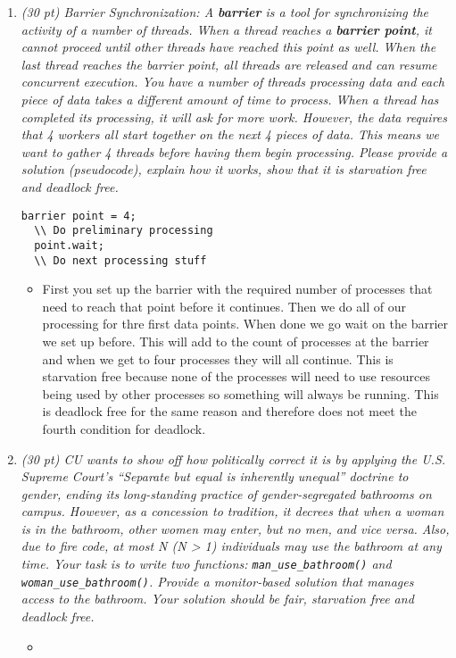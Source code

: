 \documentclass[12pt]{article}
\begin{document}
\begin{enumerate}
\pagebreak
\item{\textit{(30 pt) Barrier Synchronization: A \textbf{barrier} is a tool for synchronizing the activity of a number of threads. When a thread reaches a \textbf{barrier point}, it cannot proceed until other threads have reached this point as well. When the last thread reaches the barrier point, all threads are released and can resume concurrent execution.
You have a number of threads processing data and each piece of data takes a different amount of time to process. When a thread has completed its processing, it will ask for more work. However, the data requires that 4 workers all start together on the next 4 pieces of data. This means we want to gather 4 threads before having them begin processing.
Please provide a solution (pseudocode), explain how it works, show that it is starvation free and deadlock free.}}
\begin{small}
\begin{Verbatim}[xleftmargin=5mm]
  barrier point = 4;
  \\ Do preliminary processing
  point.wait;
  \\ Do next processing stuff
\end{Verbatim}
\end{small}
\begin{itemize}
  \item First you set up the barrier with the required number of processes that need to reach that point before it continues. Then we do all of our processing for thre first data points. When done we go wait on the barrier we set up before. This will add to the count of processes at the barrier and when we get to four processes they will all continue. This is starvation free because none of the processes will need to use resources being used by other processes so something will always be running. This is deadlock free for the same reason and therefore does not meet the fourth condition for deadlock.
\end{itemize}

\item{\textit{(30 pt) CU wants to show off how politically correct it is by applying the U.S. Supreme
Court’s “Separate but equal is inherently unequal” doctrine to gender, ending its
long-standing practice of gender-segregated bathrooms on campus. However, as a
concession to tradition, it decrees that when a woman is in the bathroom, other women
may enter, but no men, and vice versa. Also, due to fire code, at most N (N > 1)
individuals may use the bathroom at any time. Your task is to write two functions:
\texttt{man\_use\_bathroom()} and \texttt{woman\_use\_bathroom()}. Provide a monitor-based solution
that manages access to the bathroom. Your solution should be fair, starvation free and
deadlock free.}}
\begin{itemize}
  \item
\end{itemize}
\end{enumerate}
\end{document}

